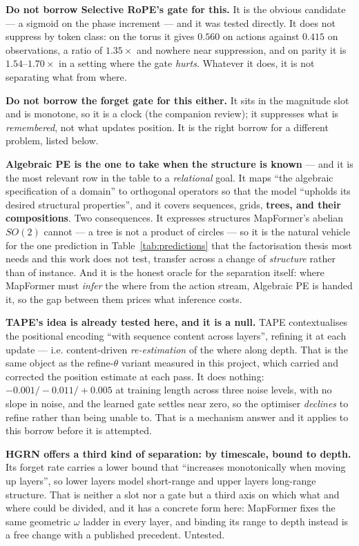 \documentclass[11pt]{article}
\begin{document}
\textbf{Do not borrow Selective RoPE's gate for this.} It is the obvious candidate
--- a sigmoid on the phase increment --- and it was tested directly. It does not
suppress by token class: on the torus it gives $0.560$ on actions against $0.415$ on
observations, a ratio of $1.35\times$ and nowhere near suppression, and on parity it
is $1.54$--$1.70\times$ in a setting where the gate \emph{hurts}. Whatever it does,
it is not separating what from where.

\textbf{Do not borrow the forget gate for this either.} It sits in the magnitude
slot and is monotone, so it is a clock (the companion review); it suppresses what
is \emph{remembered}, not what updates position. It is the right borrow for a
different problem, listed below.

\textbf{Algebraic PE is the one to take when the structure is known} --- and it is
the most relevant row in the table to a \emph{relational} goal. It maps ``the
algebraic specification of a domain'' to orthogonal operators so that the model
``upholds its desired structural properties'', and it covers sequences, grids,
\textbf{trees, and their compositions}. Two consequences. It expresses structures
MapFormer's abelian $SO(2)$ cannot --- a tree is not a product of circles --- so it
is the natural vehicle for the one prediction in Table~\ref{tab:predictions} that
the factorisation thesis most needs and this work does not test, transfer across a
change of \emph{structure} rather than of instance. And it is the honest oracle for
the separation itself: where MapFormer must \emph{infer} the where from the action
stream, Algebraic PE is handed it, so the gap between them prices what inference
costs.

\textbf{TAPE's idea is already tested here, and it is a null.} TAPE contextualises
the positional encoding ``with sequence content across layers'', refining it at each
update --- i.e. content-driven \emph{re-estimation} of the where along depth. That is
the same object as the refine-$\theta$ variant measured in this project, which
carried and corrected the position estimate at each pass. It does nothing:
$-0.001/-0.011/+0.005$ at training length across three noise levels, with no slope
in noise, and the learned gate settles near zero, so the optimiser \emph{declines}
to refine rather than being unable to. That is a mechanism answer and it applies to
this borrow before it is attempted.

\textbf{HGRN offers a third kind of separation: by timescale, bound to depth.} Its
forget rate carries a lower bound that ``increases monotonically when moving up
layers'', so lower layers model short-range and upper layers long-range structure.
That is neither a slot nor a gate but a third axis on which what and where could be
divided, and it has a concrete form here: MapFormer fixes the same geometric
$\omega$ ladder in every layer, and binding its range to depth instead is a
free change with a published precedent. Untested.
\end{document}
